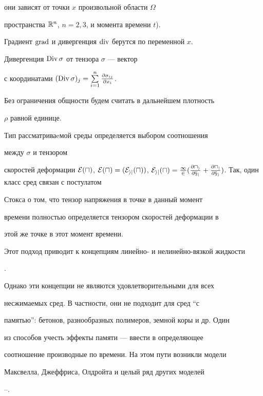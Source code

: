 они зависят от точки $x$ произвольной области $ \Omega$


пространства $\Bbb{R}^n$, $n=2,3$, и момента времени $t$).


Градиент $\operatorname{grad}$ и дивергенция $\operatorname{div}$ берутся по переменной $x$.


Дивергенция $\operatorname{Div}\sigma$ от тензора $\sigma$ --- вектор


с координатами $(\Div\sigma)_j=\sum\limits_{i=1}^{n}


\frac{\partial \sigma_{ij}}{\partial x_i}$.


Без ограничения общности будем считать в дальнейшем плотность


$\rho$ равной единице.





Тип рассматриваeмой среды определяется выбором соотношения 


между $\sigma$ и тензором


скоростей деформации $\cal{E}(u)$, $\cal{E}(u)=


(\cal{E}_{ij}(u))$, $\cal{E}_{ij}(u)=\frac


{1}{2}(\frac{\partial u_i}{\partial x_j}+\frac{\partial


u_j}{\partial x_i})$. Так, один класс сред связан с  постулатом


Стокса о том, что тензор напряжения в точке в данный момент


времени полностью определяется тензором скоростей деформации в


этой же точке в этот момент времени. 


Этот подход приводит к концепциям линейно- и нелинейно-вязкой жидкости


\cite{lit}.





Однако эти концепции не являются удовлетворительными для всех


несжимаемых сред. В частности, они не подходит для сред ``с


памятью'': бетонов, разнообразных полимеров, земной коры и др. Один


из способов учесть эффекты памяти --- ввести в определяющее


соотношение производные по времени. На этом пути возникли модели


Максвелла, Джеффриса, Олдройта и целый ряд других моделей


\cite{old2}--\cite{gs2}.





